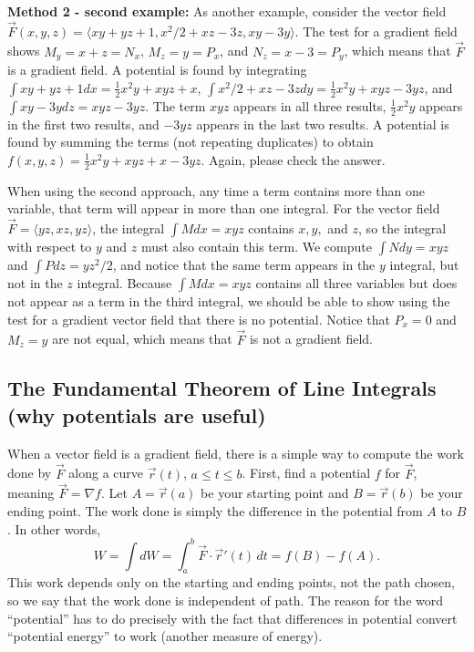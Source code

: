 \begin{example}
  \textbf{Method 2 - second example:} As another example, consider the
  vector field $\vec F(x,y,z) = \langle
  xy+yz+1,x^2/2+xz-3z,xy-3y\rangle$.  The test for a gradient field
  shows $M_y=x+z=N_x$, $M_z=y=P_x$, and $N_z=x-3=P_y$, which means
  that $\vec F$ is a gradient field.  A potential is found by
  integrating $\int xy+yz+1 dx = \frac12x^2y+xyz+x$, $\int x^2/2+xz-3z
  dy =\frac12x^2y+xyz-3yz$, and $\int xy-3y dz = xyz-3yz$. The term
  $xyz$ appears in all three results, $\frac12x^2y$ appears in the
  first two results, and $-3yz$ appears in the last two results. A
  potential is found by summing the terms (not repeating duplicates)
  to obtain $f(x,y,z) = \frac 1 2 x^2y+xyz+x-3yz$.  Again, please
  check the answer.
\end{example}
When using the second approach, any time a term contains more than one
variable, that term will appear in more than one integral. For the
vector field $\vec F = \langle yz,xz,yz\rangle$, the integral $\int Mdx = xyz$
contains $x,y,$ and $z$, so the integral with respect to $y$ and $z$
must also contain this term.  We compute $\int Ndy = xyz$ and $\int Pdz =
yz^2/2$, and notice that the same term appears in the $y$ integral,
but not in the $z$ integral. Because $\int Mdx = xyz$ contains all three
variables but does not appear as a term in the third integral, we
should be able to show using the test for a gradient vector
field that there is no potential.  Notice that $P_x=0$ and $M_z=y$
are not equal, which means that $\vec F$ is not a gradient field.


\subsection{The Fundamental Theorem of Line Integrals (why potentials
are useful)}
When a vector field is a gradient field, there is a simple way to
compute the work done by $\vec F$ along a curve $\vec r(t)$, $a\leq t\leq b$.
First, find a potential $f$ for $\vec F$, meaning $\vec F =\nabla f$. Let
$A=\vec r(a)$ be your starting point and $B=\vec r(b)$ be your ending
point. The work done is simply the difference in the potential from
$A$ to $B$.  In other words, 
$$W =\int dW= \int_a^b \vec F \cdot \vec r'(t) \,dt =f(B)-f(A).$$ 
This work depends only on the starting and ending points, not the path
chosen, so we say that the work done is independent of path.  The
reason for the word ``potential'' has to do precisely with the fact
that differences in potential convert ``potential energy'' to work
(another measure of energy).


